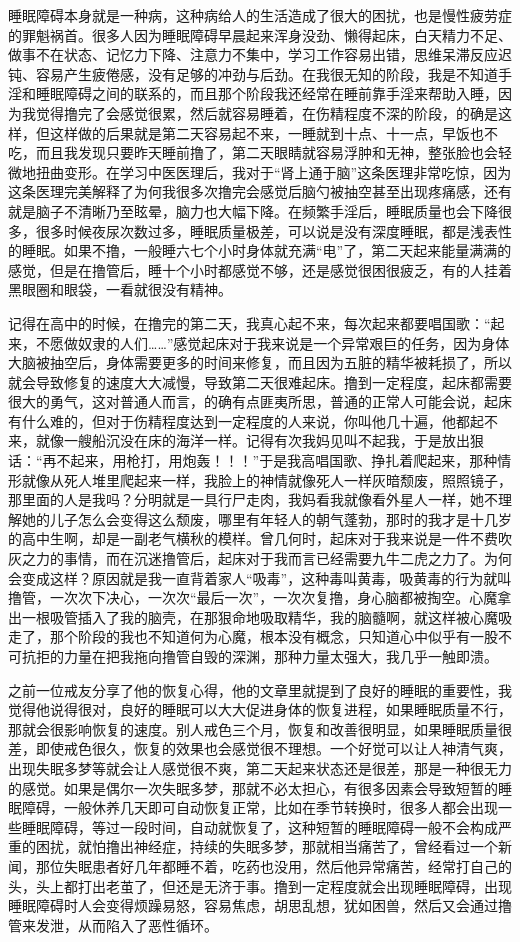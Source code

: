 睡眠障碍本身就是一种病，这种病给人的生活造成了很大的困扰，也是慢性疲劳症的罪魁祸首。很多人因为睡眠障碍早晨起来浑身没劲、懒得起床，白天精力不足、做事不在状态、记忆力下降、注意力不集中，学习工作容易出错，思维呆滞反应迟钝、容易产生疲倦感，没有足够的冲劲与后劲。在我很无知的阶段，我是不知道手淫和睡眠障碍之间的联系的，而且那个阶段我还经常在睡前靠手淫来帮助入睡，因为我觉得撸完了会感觉很累，然后就容易睡着，在伤精程度不深的阶段，的确是这样，但这样做的后果就是第二天容易起不来，一睡就到十点、十一点，早饭也不吃，而且我发现只要昨天睡前撸了，第二天眼睛就容易浮肿和无神，整张脸也会轻微地扭曲变形。在学习中医医理后，我对于“肾上通于脑”这条医理非常吃惊，因为这条医理完美解释了为何我很多次撸完会感觉后脑勺被抽空甚至出现疼痛感，还有就是脑子不清晰乃至眩晕，脑力也大幅下降。在频繁手淫后，睡眠质量也会下降很多，很多时候夜尿次数过多，睡眠质量极差，可以说是没有深度睡眠，都是浅表性的睡眠。如果不撸，一般睡六七个小时身体就充满“电”了，第二天起来能量满满的感觉，但是在撸管后，睡十个小时都感觉不够，还是感觉很困很疲乏，有的人挂着黑眼圈和眼袋，一看就很没有精神。

记得在高中的时候，在撸完的第二天，我真心起不来，每次起来都要唱国歌：“起来，不愿做奴隶的人们……”感觉起床对于我来说是一个异常艰巨的任务，因为身体大脑被抽空后，身体需要更多的时间来修复，而且因为五脏的精华被耗损了，所以就会导致修复的速度大大减慢，导致第二天很难起床。撸到一定程度，起床都需要很大的勇气，这对普通人而言，的确有点匪夷所思，普通的正常人可能会说，起床有什么难的，但对于伤精程度达到一定程度的人来说，你叫他几十遍，他都起不来，就像一艘船沉没在床的海洋一样。记得有次我妈见叫不起我，于是放出狠话：“再不起来，用枪打，用炮轰！！！”于是我高唱国歌、挣扎着爬起来，那种情形就像从死人堆里爬起来一样，我脸上的神情就像死人一样灰暗颓废，照照镜子，那里面的人是我吗？分明就是一具行尸走肉，我妈看我就像看外星人一样，她不理解她的儿子怎么会变得这么颓废，哪里有年轻人的朝气蓬勃，那时的我才是十几岁的高中生啊，却是一副老气横秋的模样。曾几何时，起床对于我来说是一件不费吹灰之力的事情，而在沉迷撸管后，起床对于我而言已经需要九牛二虎之力了。为何会变成这样？原因就是我一直背着家人“吸毒”，这种毒叫黄毒，吸黄毒的行为就叫撸管，一次次下决心，一次次“最后一次”，一次次复撸，身心脑都被掏空。心魔拿出一根吸管插入了我的脑壳，在那狠命地吸取精华，我的脑髓啊，就这样被心魔吸走了，那个阶段的我也不知道何为心魔，根本没有概念，只知道心中似乎有一股不可抗拒的力量在把我拖向撸管自毁的深渊，那种力量太强大，我几乎一触即溃。

之前一位戒友分享了他的恢复心得，他的文章里就提到了良好的睡眠的重要性，我觉得他说得很对，良好的睡眠可以大大促进身体的恢复进程，如果睡眠质量不行，那就会很影响恢复的速度。别人戒色三个月，恢复和改善很明显，如果睡眠质量很差，即使戒色很久，恢复的效果也会感觉很不理想。一个好觉可以让人神清气爽，出现失眠多梦等就会让人感觉很不爽，第二天起来状态还是很差，那是一种很无力的感觉。如果是偶尔一次失眠多梦，那就不必太担心，有很多因素会导致短暂的睡眠障碍，一般休养几天即可自动恢复正常，比如在季节转换时，很多人都会出现一些睡眠障碍，等过一段时间，自动就恢复了，这种短暂的睡眠障碍一般不会构成严重的困扰，就怕撸出神经症，持续的失眠多梦，那就相当痛苦了，曾经看过一个新闻，那位失眠患者好几年都睡不着，吃药也没用，然后他异常痛苦，经常打自己的头，头上都打出老茧了，但还是无济于事。撸到一定程度就会出现睡眠障碍，出现睡眠障碍时人会变得烦躁易怒，容易焦虑，胡思乱想，犹如困兽，然后又会通过撸管来发泄，从而陷入了恶性循环。

